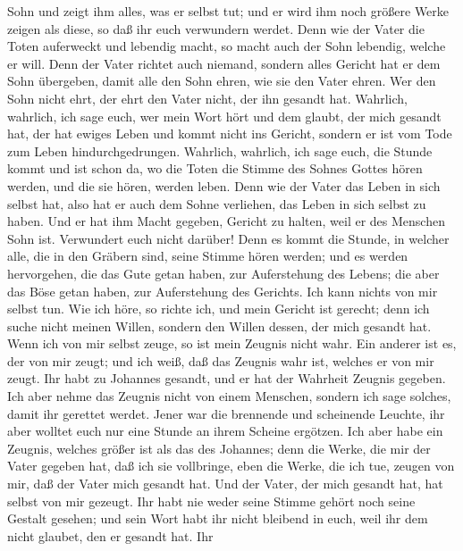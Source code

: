 Sohn und zeigt ihm alles, was er selbst tut; und er wird ihm noch
größere Werke zeigen als diese, so daß ihr euch verwundern werdet.
 Denn wie der Vater die Toten auferweckt und lebendig
macht, so macht auch der Sohn lebendig, welche er will. 
Denn der Vater richtet auch niemand, sondern alles Gericht hat er dem
Sohn übergeben,  damit alle den Sohn ehren, wie sie den
Vater ehren. Wer den Sohn nicht ehrt, der ehrt den Vater nicht, der ihn
gesandt hat.  Wahrlich, wahrlich, ich sage euch, wer mein
Wort hört und dem glaubt, der mich gesandt hat, der hat ewiges Leben und
kommt nicht ins Gericht, sondern er ist vom Tode zum Leben
hindurchgedrungen.  Wahrlich, wahrlich, ich sage euch,
die Stunde kommt und ist schon da, wo die Toten die Stimme des Sohnes
Gottes hören werden, und die sie hören, werden leben. 
Denn wie der Vater das Leben in sich selbst hat, also hat er auch dem
Sohne verliehen, das Leben in sich selbst zu haben.  Und
er hat ihm Macht gegeben, Gericht zu halten, weil er des Menschen Sohn
ist.  Verwundert euch nicht darüber! Denn es kommt die
Stunde, in welcher alle, die in den Gräbern sind, seine Stimme hören
werden;  und es werden hervorgehen, die das Gute getan
haben, zur Auferstehung des Lebens; die aber das Böse getan haben, zur
Auferstehung des Gerichts.  Ich kann nichts von mir
selbst tun. Wie ich höre, so richte ich, und mein Gericht ist gerecht;
denn ich suche nicht meinen Willen, sondern den Willen dessen, der mich
gesandt hat.  Wenn ich von mir selbst zeuge, so ist mein
Zeugnis nicht wahr.  Ein anderer ist es, der von mir
zeugt; und ich weiß, daß das Zeugnis wahr ist, welches er von mir zeugt.
 Ihr habt zu Johannes gesandt, und er hat der Wahrheit
Zeugnis gegeben.  Ich aber nehme das Zeugnis nicht von
einem Menschen, sondern ich sage solches, damit ihr gerettet werdet.
 Jener war die brennende und scheinende Leuchte, ihr aber
wolltet euch nur eine Stunde an ihrem Scheine ergötzen. 
Ich aber habe ein Zeugnis, welches größer ist als das des Johannes; denn
die Werke, die mir der Vater gegeben hat, daß ich sie vollbringe, eben
die Werke, die ich tue, zeugen von mir, daß der Vater mich gesandt hat.
 Und der Vater, der mich gesandt hat, hat selbst von mir
gezeugt. Ihr habt nie weder seine Stimme gehört noch seine Gestalt
gesehen;  und sein Wort habt ihr nicht bleibend in euch,
weil ihr dem nicht glaubet, den er gesandt hat.  Ihr
